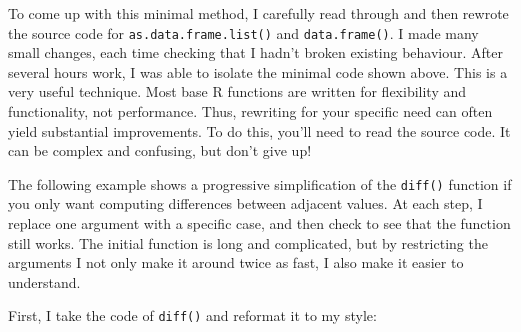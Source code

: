 To come up with this minimal method, I carefully read through and then
rewrote the source code for \texttt{as.data.frame.list()} and
\texttt{data.frame()}. I made many small changes, each time checking
that I hadn't broken existing behaviour. After several hours work, I was
able to isolate the minimal code shown above. This is a very useful
technique. Most base R functions are written for flexibility and
functionality, not performance. Thus, rewriting for your specific need
can often yield substantial improvements. To do this, you'll need to
read the source code. It can be complex and confusing, but don't give
up!

The following example shows a progressive simplification of the
\texttt{diff()} function if you only want computing differences between
adjacent values. At each step, I replace one argument with a specific
case, and then check to see that the function still works. The initial
function is long and complicated, but by restricting the arguments I not
only make it around twice as fast, I also make it easier to understand.

First, I take the code of \texttt{diff()} and reformat it to my style:

